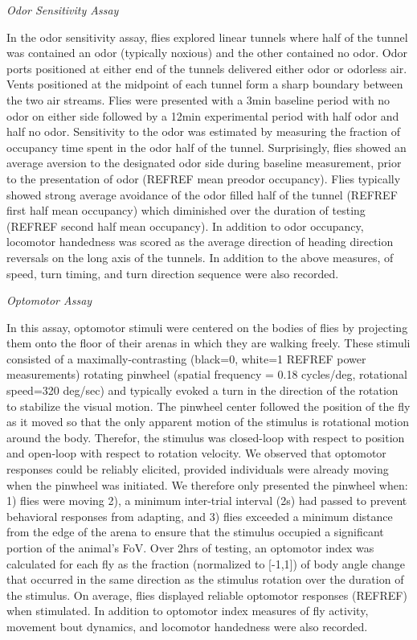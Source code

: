 \documentclass[12pt,letterpaper]{article}
\begin{document}
\textit{Odor Sensitivity Assay}

In the odor sensitivity assay, flies explored linear tunnels where half of the tunnel was contained an odor (typically noxious) and the other contained no odor. Odor ports positioned at either end of the tunnels delivered either odor or odorless air. Vents positioned at the midpoint of each tunnel form a sharp boundary between the two air streams. Flies were presented with a 3min baseline period with no odor on either side followed by a 12min experimental period with half odor and half no odor. Sensitivity to the odor was estimated by measuring the fraction of occupancy time spent in the odor half of the tunnel. Surprisingly, flies showed an average aversion to the designated odor side during baseline measurement, prior to the presentation of odor (REFREF mean preodor occupancy). Flies typically showed strong average avoidance of the odor filled half of the tunnel (REFREF first half mean occupancy) which diminished over the duration of testing (REFREF second half mean occupancy). In addition to odor occupancy, locomotor handedness was scored as the average direction of heading direction reversals on the long axis of the tunnels. In addition to the above measures, of speed, turn timing, and turn direction sequence were also recorded.

\textit{Optomotor Assay}

In this assay, optomotor stimuli were centered on the bodies of flies by projecting them onto the floor of their arenas in which they are walking freely. These stimuli consisted of a maximally-contrasting (black=0, white=1 REFREF power measurements) rotating pinwheel (spatial frequency = 0.18 cycles/deg, rotational speed=320 deg/sec) and typically evoked a turn in the direction of the rotation to stabilize the visual motion. The pinwheel center followed the position of the fly as it moved so that the only apparent motion of the stimulus is rotational motion around the body. Therefor, the stimulus was closed-loop with respect to position and open-loop with respect to  rotation velocity. We observed that optomotor responses could be reliably elicited, provided individuals were already moving when the pinwheel was initiated. We therefore only presented the pinwheel when: 1) flies were moving 2), a minimum inter-trial interval (2s) had passed to prevent behavioral responses from adapting, and 3) flies exceeded a minimum distance from the edge of the arena to ensure that the stimulus occupied a significant portion of the animal’s FoV. Over 2hrs of testing, an optomotor index was calculated for each fly as the fraction (normalized to [-1,1]) of body angle change that occurred in the same direction as the stimulus rotation over the duration of the stimulus. On average, flies displayed reliable optomotor responses (REFREF) when stimulated. In addition to optomotor index measures of fly activity, movement bout dynamics, and locomotor handedness were also recorded.
\end{document}
